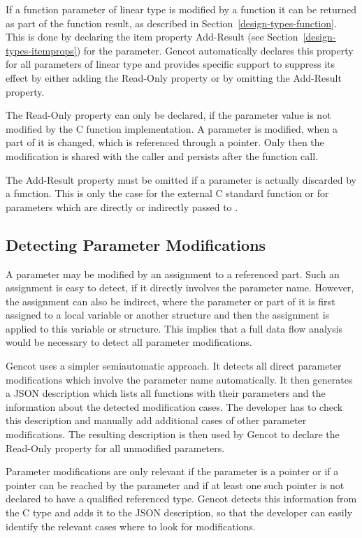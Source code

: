 If a function parameter of linear type is modified by a function it can be returned as part of the function result, 
as described in Section~\ref{design-types-function}. This is done by declaring the item property Add-Result 
(see Section~\ref{design-types-itemprops}) for the parameter. Gencot automatically declares this property for all 
parameters of linear type and provides specific support to suppress its effect by either adding the Read-Only 
property or by omitting the Add-Result property.

The Read-Only property can only be declared, if the parameter value is not modified by the C function implementation.
A parameter is modified, when a part of it is changed, which is referenced through a pointer. Only then the 
modification is shared with the caller and persists after the function call.

The Add-Result property must be omitted if a parameter is actually discarded by a function. This is only the case
for the external C standard function  or for parameters which are directly or indirectly passed to .

\subsection{Detecting Parameter Modifications}
\label{design-parmod-detect}

A parameter may be modified by an assignment to a referenced part. Such an assignment
is easy to detect, if it directly involves the parameter name. However, the assignment can also be indirect, where
the parameter or part of it is first assigned to a local variable or another structure and then the assignment
is applied to this variable or structure. This implies that a full data flow analysis would be necessary
to detect all parameter modifications.

Gencot uses a simpler semiautomatic approach. It detects all direct parameter modifications which involve the 
parameter name automatically. It then generates a JSON description which lists all functions with their parameters
and the information about the detected modification cases. The developer has to check this description and
manually add additional cases of other parameter modifications. The resulting description is then used by
Gencot to declare the Read-Only property for all unmodified parameters.

Parameter modifications are only relevant if the parameter is a pointer or if a pointer can be reached by the parameter
and if at least one such pointer is not declared to have a  qualified referenced type. Gencot detects
this information from the C type and adds it to the JSON description, so that the developer can easily identify
the relevant cases where to look for modifications.

